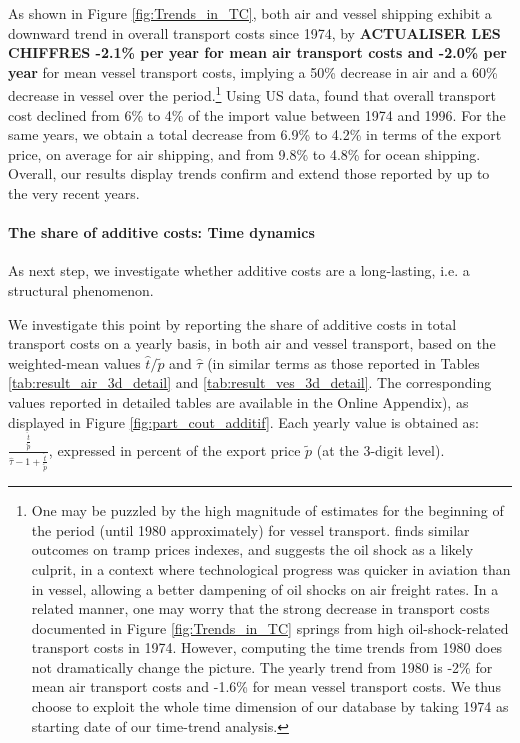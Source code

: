 \documentclass[a4paper,11pt]{article}
\begin{document}
As shown in Figure \ref{fig:Trends_in_TC}, both air and vessel shipping exhibit a downward trend in overall transport costs since 1974, by \textbf{ACTUALISER LES CHIFFRES -2.1\% per year for mean air transport costs and -2.0\% per year} for mean vessel transport costs, implying a 50\% decrease in air and a 60\% decrease in vessel over the period.\footnote{One may be puzzled by the high magnitude of estimates for the beginning of the period (until 1980 approximately) for vessel transport.
\cite{hummels2007} finds similar outcomes on tramp prices indexes, and suggests the oil shock as a likely culprit, in a context where technological progress was quicker in aviation than in vessel, allowing a better dampening of oil shocks on air freight rates.
In a related manner, one may worry that the strong decrease in transport costs documented in Figure \ref{fig:Trends_in_TC} springs from high oil-shock-related transport costs in 1974. However, computing the time trends from 1980 does not dramatically change the picture.
The yearly trend from 1980 is -2\% for mean air transport costs and -1.6\% for mean vessel transport costs.
We thus choose to exploit the whole time dimension of our database by taking 1974 as starting date of our time-trend analysis.} Using US data, \cite{Hummels_1999} found that overall transport cost declined from 6\% to 4\% of the import value between 1974 and 1996.
For the same years, we obtain a total decrease from 6.9\% to 4.2\% in terms of the export price, on average for air shipping, and from 9.8\% to 4.8\% for ocean shipping. Overall, our results display trends confirm and extend those reported by \cite{Hummels_1999} up to the very recent years.\smallskip

\paragraph{The share of additive costs: Time dynamics} As next step, we investigate whether additive costs are a long-lasting, i.e. a structural phenomenon.

We investigate this point by reporting the share of additive costs in total transport costs on a yearly basis, in both air and vessel transport, based on the weighted-mean values $\widehat{t}/\widetilde{p}$ and $\widehat{\tau}$ (in similar terms as those reported in Tables \ref{tab:result_air_3d_detail} and \ref{tab:result_ves_3d_detail}.
The corresponding values reported in detailed tables are available in the Online Appendix), as displayed in Figure \ref{fig:part_cout_additif}.
Each yearly value is obtained as: $\frac{\frac{\widehat{t}}{\widetilde{p}}}{\widehat{\tau}-1+\frac{\widehat{t}}{\widetilde{p}}}$, expressed in percent of the export price $\widetilde{p}$ (at the 3-digit level).
\end{document}
